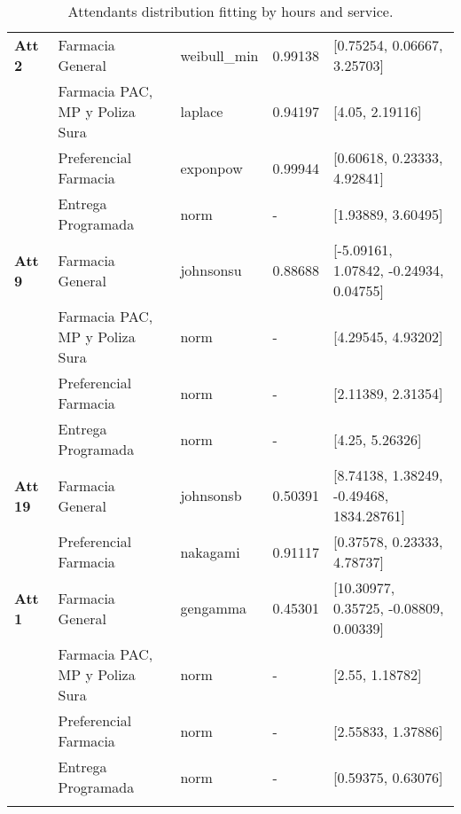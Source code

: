 \begin{longtable}[c]{lp{3cm}llp{5cm}}
\textbf{Att 2}  & Farmacia General                         & weibull\_min & 0.99138 & {[}0.75254, 0.06667, 3.25703{]}                                                          \\
       & Farmacia PAC, MP y Poliza Sura           & laplace      & 0.94197 & {[}4.05, 2.19116{]}                                                                      \\
       & Preferencial Farmacia                    & exponpow     & 0.99944 & {[}0.60618, 0.23333, 4.92841{]}                                                          \\
       & Entrega Programada                       & norm         & -       & {[}1.93889, 3.60495{]}                                                                   \\ \hline
\textbf{Att 9}  & Farmacia General                         & johnsonsu    & 0.88688 & {[}-5.09161, 1.07842, -0.24934, 0.04755{]}                                               \\
       & Farmacia PAC, MP y Poliza Sura           & norm         & -       & {[}4.29545, 4.93202{]}                                                                   \\
       & Preferencial Farmacia                    & norm         & -       & {[}2.11389, 2.31354{]}                                                                   \\
       & Entrega Programada                       & norm         & -       & {[}4.25, 5.26326{]}                                                                      \\ \hline
\textbf{Att 19} & Farmacia General                         & johnsonsb    & 0.50391 & {[}8.74138, 1.38249, -0.49468, 1834.28761{]}                                             \\
       & Preferencial Farmacia                    & nakagami     & 0.91117 & {[}0.37578, 0.23333, 4.78737{]}                                                          \\ \hline
\textbf{Att 1}  & Farmacia General                         & gengamma     & 0.45301 & {[}10.30977, 0.35725, -0.08809, 0.00339{]}                                               \\
       & Farmacia PAC, MP y Poliza Sura           & norm         & -       & {[}2.55, 1.18782{]}                                                                      \\
       & Preferencial Farmacia                    & norm         & -       & {[}2.55833, 1.37886{]}                                                                   \\
       & Entrega Programada                       & norm         & -       & {[}0.59375, 0.63076{]}                                                                   \\ \hline
\caption{Attendants distribution fitting by hours and service.}
\label{tab:att_serv}
\end{longtable}

